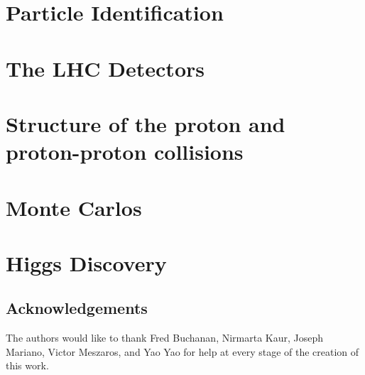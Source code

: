 \documentclass[11pt,fleqn]{book} %
\begin{document}
\chapter{Particle Identification}


\chapter{The LHC Detectors}


\chapter{Structure of the proton and proton-proton collisions}


\chapter{Monte Carlos}


\chapter{Higgs Discovery}


\section{Acknowledgements}
The authors would like to thank Fred Buchanan, Nirmarta Kaur, Joseph Mariano, Victor Meszaros, and Yao Yao for help at every stage of the creation of this work.
\end{document}
